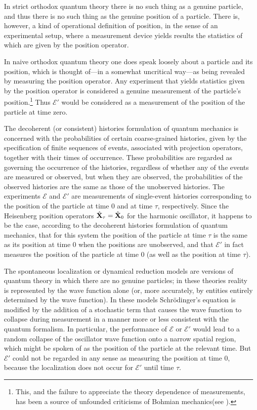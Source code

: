 \documentclass[12pt]{article}
\newcommand{\Sc}{Schr\"{o}dinger}
\newcommand{\BM}{Bohmian mechanics}
\newcommand{\wf}{wave function}
\newcommand{\E}{\mbox{$\mathscr{E}$}}
\begin{document}
In strict orthodox quantum theory there is no such thing as a genuine
particle, and thus there is no such thing as the genuine position of a
particle. There is, however, a kind of operational definition of
position, in the sense of an experimental setup, where a measurement
device yields results the statistics of which are given by the
position operator.


In naive orthodox quantum theory one does speak loosely about a
particle and its position, which is thought of---in a somewhat
uncritical way---as being revealed by measuring the position operator.
Any experiment that yields statistics given by the position operator
is considered a genuine measurement of the particle's
position.\footnote{This, and the failure to appreciate the theory
   dependence of measurements, has been a source of unfounded
   criticisms of \BM (see \cite{ESSW92, DFGZ93f, DHS93}).}  Thus $\E'$
would be considered as a measurement of the position of the particle
at time zero.

The decoherent (or consistent) histories formulation of quantum
mechanics \cite{GMH90, Omn88, Gri84} is concerned with the
probabilities of certain coarse-grained histories, given by the
specification of finite sequences of events, associated with
projection operators, together with their times of occurrence.  These
probabilities are regarded as governing the occurrence of the
histories, regardless of whether any of the events are measured or
observed, but when they are observed, the probabilities of the
observed histories are the same as those of the unobserved histories.
The experiments \E{} and $\E'$ are measurements of single-event
histories corresponding to the position of the particle at time $0$
and at time $\tau$, respectively.  Since the Heisenberg position
operators $\hat{\bf X}_\tau =\hat{\bf X}_0$ for the harmonic
oscillator, it happens to be the case, according to the decoherent
histories formulation of quantum mechanics, that for this system the
position of the particle at time $\tau$ is the same as its position at
time $0$ when the positions are unobserved, and that $\E'$ in fact
measures the position of the particle at time $0$ (as well as the
position at time $\tau$).


The spontaneous localization or dynamical reduction models
\cite{GRW,GRP90} are versions of quantum theory in which there are no
genuine particles; in these theories reality is represented by the
wave function alone (or, more accurately, by entities entirely
determined by the \wf{}).  In these models \Sc{}'s equation is
modified by the addition of a stochastic term that causes the \wf{} to
collapse during measurement in a manner more or less consistent with
the quantum formalism. In particular, the performance of \E{} or $\E'$
would lead to a random collapse of the oscillator wave function onto a
narrow spatial region, which might be spoken of as the position of the
particle at the relevant time. But $\E'$ could not be regarded in any
sense as measuring the position at time $0$, because the localization
does not occur for $\E'$ until time $\tau$.
\end{document}
